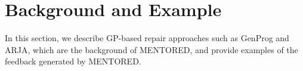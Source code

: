 \documentclass[10pt,conference]{IEEEtran}
\begin{document}



\section{Background and Example}
    In this section, we describe GP-based repair approaches such as GenProg and ARJA, which are the background of MENTORED, and provide examples of the feedback generated by MENTORED.
\end{document}
